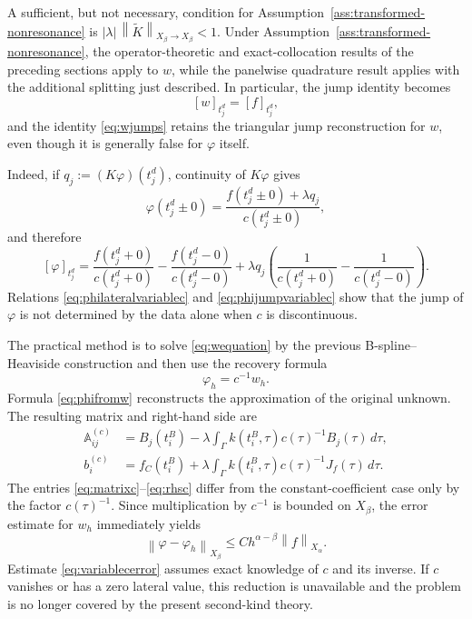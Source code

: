 \documentclass[11pt,a4paper]{amsart}
\theoremstyle{plain}
\theoremstyle{definition}
\theoremstyle{remark}
\newcommand{\Ga}{\Gamma}
\newcommand{\norm}[1]{\left\|#1\right\|}
\begin{document}
A sufficient, but not necessary, condition for Assumption~\ref{ass:transformed-nonresonance} is $|\lambda|\,\norm{\widetilde K}_{X_\beta\to X_\beta}<1$.  Under Assumption~\ref{ass:transformed-nonresonance}, the operator-theoretic and exact-collocation results of the preceding sections apply to $w$, while the panelwise quadrature result applies with the additional splitting just described.  In particular, the jump identity becomes
\begin{equation}\label{eq:wjumps}
        [w]_{t_j^d}=[f]_{t_j^d},
\end{equation}
and the identity \eqref{eq:wjumps} retains the triangular jump reconstruction for $w$, even though it is generally false for $\varphi$ itself.

Indeed, if $q_j:=(K\varphi)(t_j^d)$, continuity of $K\varphi$ gives
\begin{equation}\label{eq:philateralvariablec}
 \varphi(t_j^d\pm0)
 =\frac{f(t_j^d\pm0)+\lambda q_j}{c(t_j^d\pm0)},
\end{equation}
and therefore
\begin{equation}\label{eq:phijumpvariablec}
 [\varphi]_{t_j^d}
 =\frac{f(t_j^d+0)}{c(t_j^d+0)}
  -\frac{f(t_j^d-0)}{c(t_j^d-0)}
  +\lambda q_j
  \left(\frac1{c(t_j^d+0)}-\frac1{c(t_j^d-0)}\right).
\end{equation}
Relations \eqref{eq:philateralvariablec} and \eqref{eq:phijumpvariablec} show that the jump of $\varphi$ is not determined by the data alone when $c$ is discontinuous.

The practical method is to solve \eqref{eq:wequation} by the previous B-spline--Heaviside construction and then use the recovery formula
\begin{equation}\label{eq:phifromw}
        \varphi_h=c^{-1}w_h.
\end{equation}
Formula \eqref{eq:phifromw} reconstructs the approximation of the original unknown.  The resulting matrix and right-hand side are
\begin{align}
 \mathbb A_{ij}^{(c)}
 &=B_j(t_i^B)
 -\lambda\int_\Ga k(t_i^B,\tau)c(\tau)^{-1}B_j(\tau)\,d\tau,
 \label{eq:matrixc}\\
 b_i^{(c)}
 &=f_C(t_i^B)
 +\lambda\int_\Ga k(t_i^B,\tau)c(\tau)^{-1}J_f(\tau)\,d\tau.
 \label{eq:rhsc}
\end{align}
The entries \eqref{eq:matrixc}--\eqref{eq:rhsc} differ from the constant-coefficient case only by the factor $c(\tau)^{-1}$.  Since multiplication by $c^{-1}$ is bounded on $X_\beta$, the error estimate for $w_h$ immediately yields
\begin{equation}\label{eq:variablecerror}
        \norm{\varphi-\varphi_h}_{X_\beta}
        \le Ch^{\alpha-\beta}\norm{f}_{X_\alpha}.
\end{equation}
Estimate \eqref{eq:variablecerror} assumes exact knowledge of $c$ and its inverse.  If $c$ vanishes or has a zero lateral value, this reduction is unavailable and the problem is no longer covered by the present second-kind theory.
\end{document}
